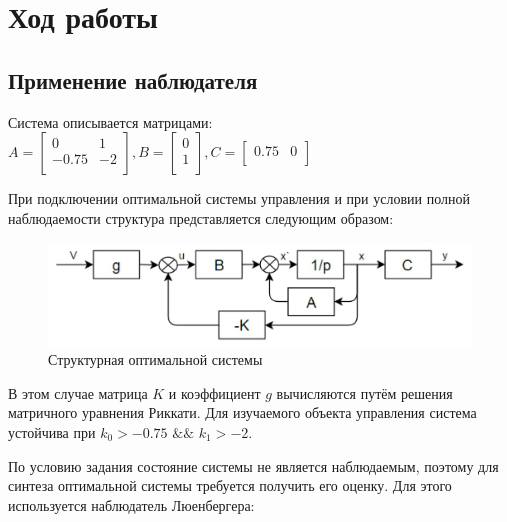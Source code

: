 \newpage
\section{Ход работы}

\subsection{Применение наблюдателя}

Система описывается матрицами:
\noindent$A=
	\begin{bmatrix}
	0 & 1 \\
	-0.75 & -2 \\
	\end{bmatrix}
	, B=
	\begin{bmatrix}
	0 \\
	1 \\
	\end{bmatrix}
	, C=
	\begin{bmatrix}
	0.75 & 0 \\
	\end{bmatrix}
	$

При подключении оптимальной системы управления и при условии полной наблюдаемости структура представляется следующим образом:

\begin{figure}[h!]
	\centering
	\includegraphics[scale = 0.40]{images/1.png}
	\caption{Структурная оптимальной системы}
	\label{image:2}
\end{figure}
\FloatBarrier
В этом случае матрица $K$ и коэффициент $g$ вычисляются путём решения матричного уравнения Риккати. Для изучаемого объекта управления система устойчива при $k_0>-0.75$ $\&\&$ $k_1>-2$.

По условию задания состояние системы не является наблюдаемым, поэтому для синтеза оптимальной системы требуется получить его оценку. Для этого используется наблюдатель Люенбергера:

